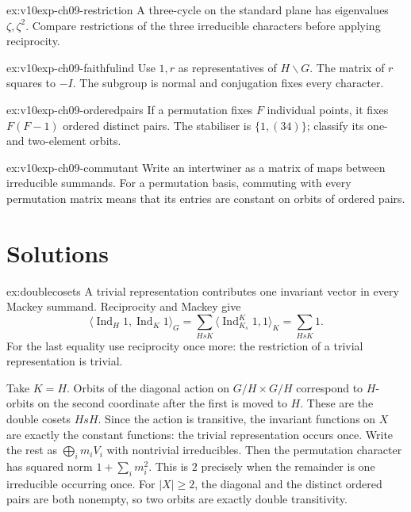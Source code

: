 \begin{hint}{ex:v10exp-ch09-restriction}
A three-cycle on the standard plane has eigenvalues $\zeta,\zeta^2$. Compare restrictions of the three irreducible characters before applying reciprocity.
\end{hint}
\begin{hint}{ex:v10exp-ch09-faithfulind}
Use $1,r$ as representatives of $H\backslash G$. The matrix of $r$ squares to $-I$. The subgroup is normal and conjugation fixes every character.
\end{hint}
\begin{hint}{ex:v10exp-ch09-orderedpairs}
If a permutation fixes $F$ individual points, it fixes $F(F-1)$ ordered distinct pairs. The stabiliser is $\{1,(34)\}$; classify its one- and two-element orbits.
\end{hint}
\begin{hint}{ex:v10exp-ch09-commutant}
Write an intertwiner as a matrix of maps between irreducible summands. For a permutation basis, commuting with every permutation matrix means that its entries are constant on orbits of ordered pairs.
\end{hint}

\section{Solutions}

\begin{solution}{ex:doublecosets}
\idea A trivial representation contributes one invariant vector in every Mackey summand.
\writeup Reciprocity and Mackey give
\[
\langle\operatorname{Ind}_H1,\operatorname{Ind}_K1\rangle_G
=\sum_{HsK}\langle\operatorname{Ind}_{K_s}^K1,1\rangle_K
=\sum_{HsK}1.
\]
For the last equality use reciprocity once more: the restriction of a trivial representation is trivial.

Take $K=H$. Orbits of the diagonal action on $G/H\times G/H$ correspond to $H$-orbits on the second coordinate after the first is moved to $H$. These are the double cosets $HsH$. Since the action is transitive, the invariant functions on $X$ are exactly the constant functions: the trivial representation occurs once. Write the rest as $\bigoplus_i m_iV_i$ with nontrivial irreducibles. Then the permutation character has squared norm $1+\sum_i m_i^2$. This is $2$ precisely when the remainder is one irreducible occurring once. For $|X|\ge2$, the diagonal and the distinct ordered pairs are both nonempty, so two orbits are exactly double transitivity.
\end{solution}

